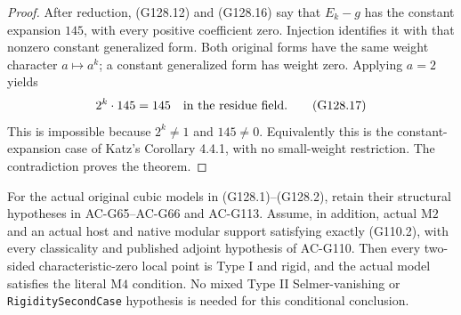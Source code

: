 \begin{proof}
After reduction, (G128.12) and (G128.16) say that \(E_k-g\)
has the constant expansion \(145\), with every positive
coefficient zero.  Injection identifies it with that nonzero
constant generalized form.  Both original forms have the
same weight character \(a\mapsto a^k\); a constant generalized
form has weight zero.  Applying \(a=2\) yields
\[
                           2^k\cdot145=145
                               \quad\hbox{in the residue field}.
 \tag{G128.17}
\]
This is impossible because \(2^k\ne1\) and \(145\ne0\).
Equivalently this is the constant-expansion case of Katz's
Corollary 4.4.1, with no small-weight restriction.
The contradiction proves the theorem.
\end{proof}

\begin{corollary}
\label{cor:G128-quartic-M4}
For the actual original cubic models in (G128.1)--(G128.2),
retain their structural hypotheses in AC-G65--AC-G66 and
AC-G113.  Assume, in addition, actual \(\mathrm{M2}\) and
an actual host and native modular support satisfying exactly
(G110.2), with every classicality and published adjoint
hypothesis of AC-G110.  Then every two-sided
characteristic-zero local point is Type I and rigid, and the
actual model satisfies the literal \(\mathrm{M4}\) condition.
No mixed Type II Selmer-vanishing or
\texttt{RigiditySecondCase} hypothesis is needed for this
conditional conclusion.
\end{corollary}

